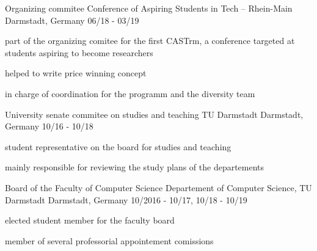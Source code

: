 

\begin{cventries}

  \cventry
    {Organizing commitee} %
    {Conference of Aspiring Students in Tech -- Rhein-Main} %
    {Darmstadt, Germany} %
    {06/18 - 03/19} %
    {
      \begin{cvitems} %
        \item {part of the organizing comitee for the first CASTrm, a conference targeted at students aspiring to become researchers}
        \item {helped to write price winning concept}
        \item {in charge of coordination for the programm and the diversity team}
      \end{cvitems}
    }
  \cventry
    {University senate commitee on studies and teaching} %
    {TU Darmstadt} %
    {Darmstadt, Germany} %
    {10/16 - 10/18} %
    {
      \begin{cvitems} %
        \item {student representative on the board for studies and teaching}
        \item {mainly responsible for reviewing the study plans of the departements}
      \end{cvitems}
    }

  \cventry
    {Board of the Faculty of Computer Science} %
    {Departement of Computer Science, TU Darmstadt} %
    {Darmstadt, Germany} %
    {10/2016 - 10/17, 10/18 - 10/19} %
    {
      \begin{cvitems} %
        \item {elected student member for the faculty board}
        \item {member of several professorial appointement comissions}
      \end{cvitems}
    }


\end{cventries}
